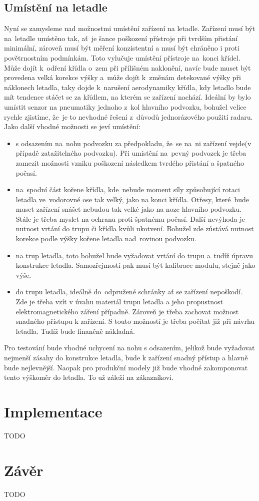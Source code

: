 	\section{Umístění na letadle}\label{navrhReseni::umisteniNaLetadle}
		Nyní se zamysleme nad možnostmi umístění zařízení na letadle. Zařízení musí být na~letadle umístěno tak, ať~je šance poškození přístroje při tvrdším přistání minimální, zároveň musí být měření konzistentní a musí být chráněno i proti povětrnostním podmínkám. Toto vylučuje umístění přístroje na~konci křídel. Může dojít k~odření křídla o~zem při přílišném naklonění, navíc bude muset být provedena velká korekce výšky a~může dojít k~změnám detekované výšky při náklonech letadla, taky dojde k~narušení aerodynamiky křídla, kdy letadlo bude mít tendence stáčet se za křídlem, na kterém se zařízení nachází. Ideální by bylo umístit senzor na pneumatiky jednoho z~kol hlavního podvozku, bohužel velice rychle zjistíme, že~je to nevhodné řešení z~důvodů jednorázového použití radaru. Jako další vhodné možnosti se jeví umístění:
		\begin{itemize}
			\item s odsazením na~nohu podvozku za předpokladu, že~se na~ni zařízení vejde(v případě zatažitelného podvozku). Při umístění na~pevný podvozek je třeba zamezit možnosti vzniku poškození následkem tvrdého přistání a špatného počasí. 
			\item na~spodní část kořene křídla, kde~nebude moment síly způsobující rotaci letadla ve~vodorovné ose tak velký, jako na konci křídla. Otřesy, které~bude muset zařízení snášet nebudou tak velké jako na noze hlavního podvozku. Stále je třeba myslet na ochranu proti špatnému počasí. Další nevýhoda je nutnost vrtání do trupu či křídla kvůli ukotvení. Bohužel zde zůstává nutnost korekce podle výšky kořene letadla nad~rovinou podvozku.
			\item na trup letadla, toto bohužel bude vyžadovat vrtání do trupu a~tudíž úpravu konstrukce letadla. Samozřejmostí pak musí být kalibrace modulu, stejně jako výše.
			\item do trupu letadla, ideálně do~odpružené schránky ať se zařízení nepoškodí. Zde je třeba vzít v úvahu materiál trupu letadla a jeho propustnost elektromagnetického záření případně. Zároveň je třeba zachovat možnost snadného přístupu k zařízení. S touto možností je třeba počítat již při návrhu letadla. Tudíž bude finančně nákladná.
		\end{itemize} 
		Pro testování bude vhodné uchycení na nohu s odsazením, jelikož bude vyžadovat nejmenší zásahy do konstrukce letadla, bude k zařízení snadný přístup a hlavně bude nejlevnější.
		Naopak pro produkční modely již bude vhodné zakomponovat tento výškoměr do letadla. To už záleží na zákazníkovi.
		
\chapter{Implementace}
	TODO
\chapter{Závěr}
	TODO

